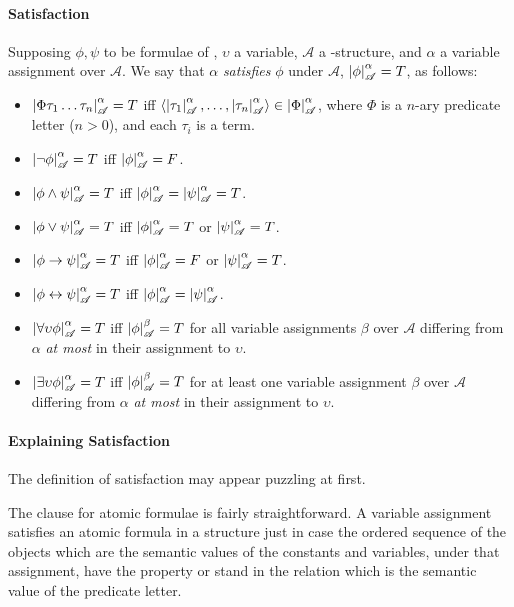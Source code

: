 \paragraph{Satisfaction}

\begin{definition}[Satisfaction]
Supposing $\phi,\psi$ to be formulae of \ltwo, $\upsilon$ a variable, $\mathscr{A}$ a \ltwo-structure, and $\alpha$ a variable assignment over $\mathscr{A}$. We say that $\alpha$ \emph{satisfies} $\phi$ under $\mathscr{A}$, $\left|\phi\right|^{\alpha}_{\mathscr{A}}=T$, as follows: \begin{itemize}
	\item $\left|\Phi\tau_{1}\ldots\tau_{n}\right|^{\alpha}_{\mathscr{A}}=T$ iff $\langle \left|\tau_{1}\right|^{\alpha}_{\mathscr{A}},\ldots,\left|\tau_{n}\right|^{\alpha}_{\mathscr{A}}\rangle \in \left|\Phi\right|^{\alpha}_{\mathscr{A}}$, where $\Phi$ is a $n$-ary predicate letter ($n>0$), and each $\tau_{i}$ is a term.
	\item $\left|\neg\phi\right|^{\alpha}_{\mathscr{A}}=T$ iff $\left|\phi\right|^{\alpha}_{\mathscr{A}}=F$.
	\item $\left|\phi\wedge\psi\right|^{\alpha}_{\mathscr{A}}=T$ iff $\left|\phi\right|^{\alpha}_{\mathscr{A}}=\left|\psi\right|^{\alpha}_{\mathscr{A}}=T$.
	\item $\left|\phi\vee\psi\right|^{\alpha}_{\mathscr{A}}=T$ iff $\left|\phi\right|^{\alpha}_{\mathscr{A}}=T$ or $\left|\psi\right|^{\alpha}_{\mathscr{A}}=T$.
	\item $\left|\phi\to\psi\right|^{\alpha}_{\mathscr{A}}=T$ iff $\left|\phi\right|^{\alpha}_{\mathscr{A}}=F$ or $\left|\psi\right|^{\alpha}_{\mathscr{A}}=T$.
	\item $\left|\phi\leftrightarrow\psi\right|^{\alpha}_{\mathscr{A}}=T$ iff $\left|\phi\right|^{\alpha}_{\mathscr{A}}=\left|\psi\right|^{\alpha}_{\mathscr{A}}$.
	\item $\left|\forall \upsilon\phi\right|^{\alpha}_{\mathscr{A}}=T$ iff $\left|\phi\right|^{\beta}_{\mathscr{A}}=T$ for all variable assignments $\beta$ over $\mathscr{A}$ differing from $\alpha$ \emph{at most} in their assignment to $\upsilon$.
		\item $\left|\exists \upsilon\phi\right|^{\alpha}_{\mathscr{A}}=T$ iff $\left|\phi\right|^{\beta}_{\mathscr{A}}=T$ for at least one variable assignment $\beta$ over $\mathscr{A}$ differing from $\alpha$ \emph{at most} in their assignment to $\upsilon$.
\end{itemize}
\end{definition}

\paragraph{Explaining Satisfaction}

The definition of satisfaction may appear puzzling at first.

The clause for atomic formulae is fairly straightforward. A variable assignment satisfies an atomic formula in a structure just in case the ordered sequence of the  objects which are the semantic values of the constants and variables, under that assignment, have the property or stand in the  relation which is the semantic value of the predicate letter. 

